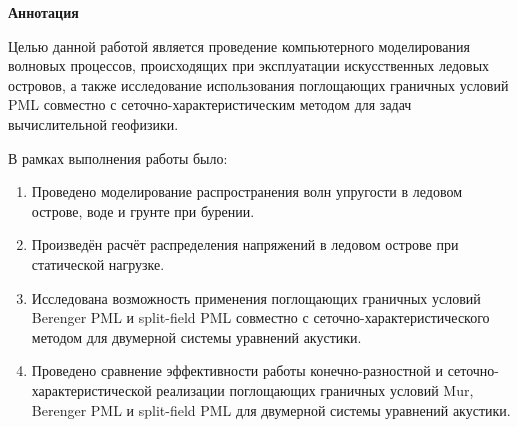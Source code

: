 \thispagestyle{plain}
\begin{center}
    \Large
    \textbf{Аннотация}
\end{center}

Целью данной работой является проведение компьютерного моделирования волновых процессов, происходящих при эксплуатации искусственных ледовых островов, а также исследование использования поглощающих граничных условий PML совместно с сеточно-характеристическим методом для задач вычислительной геофизики.

В рамках выполнения работы было:
\begin{enumerate}
    \item Проведено моделирование распространения волн упругости в ледовом острове, воде и грунте при бурении.
    \item Произведён расчёт распределения напряжений в ледовом острове при статической нагрузке.
    \item Исследована возможность применения поглощающих граничных условий Berenger PML и split-field PML совместно с сеточно-характеристического методом для двумерной системы уравнений акустики.%
    \item Проведено сравнение эффективности работы конечно-разностной и сеточно-харак\-теристической реализации поглощающих граничных условий Mur, Berenger PML и split-field PML для двумерной системы уравнений акустики.
\end{enumerate}

\newpage